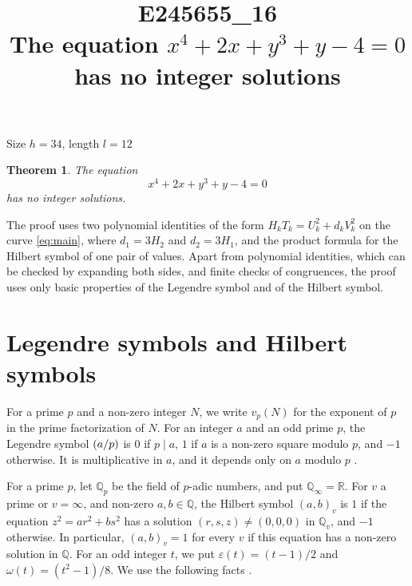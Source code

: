 \documentclass[11pt]{article}
\title{\textbf{E245655\_16}\\[4pt] {\Large The equation $x^{4}+2x+y^{3}+y-4=0$ has no integer solutions}}
\author{}
\date{}
\newtheorem{theorem}{Theorem}
\newcommand{\Q}{\mathbb{Q}}
\newcommand{\leg}[2]{\mathchoice{\biggl(\dfrac{#1}{#2}\biggr)}{(#1/#2)}{(#1/#2)}{(#1/#2)}}
\begin{document}
\maketitle
\vspace{-8ex}
\begin{center}
Size $h=34$, length $l=12$
\end{center}

\begin{theorem}\label{thm:main}
The equation
\begin{equation}\label{eq:main}
x^{4}+2x+y^{3}+y-4=0
\end{equation}
has no integer solutions.
\end{theorem}

The proof uses two polynomial identities of the form $H_kT_k=U_k^2+d_kV_k^2$ on the curve \eqref{eq:main}, where $d_{1}=3H_{2}$ and $d_{2}=3H_{1}$, and the product formula for the Hilbert symbol of one pair of values. Apart from polynomial identities, which can be checked by expanding both sides, and finite checks of congruences, the proof uses only basic properties of the Legendre symbol and of the Hilbert symbol.

\section{Legendre symbols and Hilbert symbols}

For a prime $p$ and a non-zero integer $N$, we write $v_p(N)$ for the exponent of $p$ in the prime factorization of $N$. For an integer $a$ and an odd prime $p$, the Legendre symbol $\leg{a}{p}$ is $0$ if $p\mid a$, $1$ if $a$ is a non-zero square modulo $p$, and $-1$ otherwise. It is multiplicative in $a$, and it depends only on $a$ modulo $p$ \cite[Chapter~5]{IR}.

For a prime $p$, let $\Q_p$ be the field of $p$-adic numbers, and put $\Q_\infty=\mathbb R$. For $v$ a prime or $v=\infty$, and non-zero $a,b\in\Q$, the Hilbert symbol $(a,b)_v$ is $1$ if the equation $z^2=ar^2+bs^2$ has a solution $(r,s,z)\neq(0,0,0)$ in $\Q_v$, and $-1$ otherwise. In particular, $(a,b)_v=1$ for every $v$ if this equation has a non-zero solution in $\Q$. For an odd integer $t$, we put $\varepsilon(t)=(t-1)/2$ and $\omega(t)=(t^2-1)/8$. We use the following facts \cite[Chapter~III, Proposition~2 and Theorems~1 and~3]{Se}.
\end{document}
